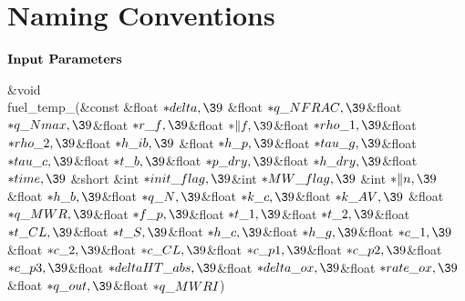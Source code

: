 \documentclass[letterpaper,12pt,baseclass=report]{cweb-hy}
\begin{document}
{\section{Naming Conventions}
$\bf{Input}$ $\bf{Parameters}$\\
{ \small
\Y\B\&{void} \\{fuel\_temp\_}(\&{const} \&{float} ${}{*}\\{delta},\39{}$%
\&{float} ${}{*}\\{q\_NFRAC},\39{}$\&{float} ${}{*}\\{q\_Nmax},\39{}$\&{float}
${}{*}\\{r\_f},\39{}$\&{float} ${}{*}\|f,\39{}$\&{float} ${}{*}\\{rho\_1},%
\39{}$\&{float} ${}{*}\\{rho\_2},\39{}$\&{float} ${}{*}\\{h\_ib},\39{}$%
\&{float} ${}{*}\\{h\_p},\39{}$\&{float} ${}{*}\\{tau\_g},\39{}$\&{float}
${}{*}\\{tau\_c},\39{}$\&{float} ${}{*}\\{t\_b},\39{}$\&{float} ${}{*}\\{p%
\_dry},\39{}$\&{float} ${}{*}\\{h\_dry},\39{}$\&{float} ${}{*}\\{time},\39{}$%
\&{short} \&{int} ${}{*}\\{init\_flag},\39{}$\&{int} ${}{*}\\{MW\_flag},\39{}$%
\&{int} ${}{*}\|n,\39{}$\&{float} ${}{*}\\{h\_b},\39{}$\&{float} ${}{*}\\{q%
\_N},\39{}$\&{float} ${}{*}\\{k\_c},\39{}$\&{float} ${}{*}\\{k\_AV},\39{}$%
\&{float} ${}{*}\\{q\_MWR},\39{}$\&{float} ${}{*}\\{f\_p},\39{}$\&{float}
${}{*}\\{t\_1},\39{}$\&{float} ${}{*}\\{t\_2},\39{}$\&{float} ${}{*}\\{t\_CL},%
\39{}$\&{float} ${}{*}\\{t\_S},\39{}$\&{float} ${}{*}\\{h\_c},\39{}$\&{float}
${}{*}\\{h\_g},\39{}$\&{float} ${}{*}\\{c\_1},\39{}$\&{float} ${}{*}\\{c\_2},%
\39{}$\&{float} ${}{*}\\{c\_CL},\39{}$\&{float} ${}{*}\\{c\_p1},\39{}$\&{float}
${}{*}\\{c\_p2},\39{}$\&{float} ${}{*}\\{c\_p3},\39{}$\&{float} ${}{*}%
\\{deltaHT\_abs},\39{}$\&{float} ${}{*}\\{delta\_ox},\39{}$\&{float} ${}{*}%
\\{rate\_ox},\39{}$\&{float} ${}{*}\\{q\_out},\39{}$\&{float} ${}{*}\\{q%
\_MWRI}{}$)\par
\fi

}}
\end{document}

